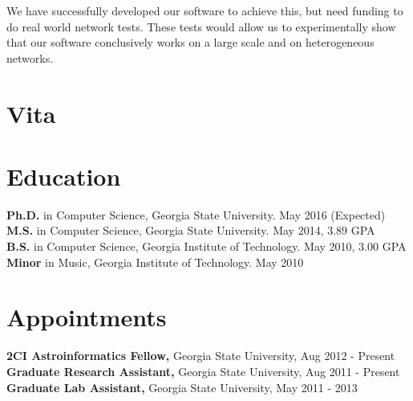 \documentclass[12pt,a4paper]{article}
\begin{document}
We have successfully developed our software to achieve this, but need funding to do real world network tests. 
These tests would allow us to experimentally show that our software conclusively works on a large scale and on heterogeneous networks.





\newpage



\section{Vita}

\section*{Education}          
    
{\bf Ph.D.} in Computer Science, Georgia State University. May 2016 (Expected)\\
{\bf M.S.} in Computer Science, Georgia State University. May 2014, 3.89 GPA \\
{\bf B.S.} in Computer Science, Georgia Institute of Technology. May 2010, 3.00 GPA\\
{\bf Minor} in Music, Georgia Institute of Technology. May 2010\\
	
\section*{Appointments}
{\bf 2CI Astroinformatics Fellow,} Georgia State University, Aug 2012 - Present\\
{\bf Graduate Research Assistant,} Georgia State University, Aug 2011 - Present\\
{\bf Graduate Lab Assistant,} Georgia State University, May 2011 - 2013
\end{document}
